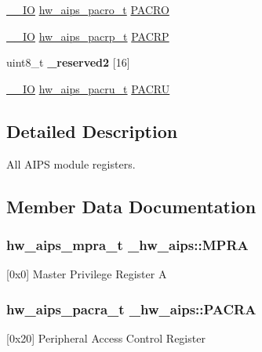 \begin{DoxyCompactItemize}
\item 
\hyperlink{core__sc300_8h_aec43007d9998a0a0e01faede4133d6be}{\+\_\+\+\_\+\+IO} \hyperlink{union__hw__aips__pacro}{hw\+\_\+aips\+\_\+pacro\+\_\+t} \hyperlink{struct__hw__aips_a0d26b9dd4c8d965d38a908720cc30631}{P\+A\+C\+RO}
\item 
\hyperlink{core__sc300_8h_aec43007d9998a0a0e01faede4133d6be}{\+\_\+\+\_\+\+IO} \hyperlink{union__hw__aips__pacrp}{hw\+\_\+aips\+\_\+pacrp\+\_\+t} \hyperlink{struct__hw__aips_a04e3d2f12f78b6bad6cc1dbb8c24c704}{P\+A\+C\+RP}
\item 
uint8\+\_\+t {\bfseries \+\_\+reserved2} \mbox{[}16\mbox{]}\hypertarget{struct__hw__aips_abe4fbc96c443539d143fbbd6bf7f08f4}{}\label{struct__hw__aips_abe4fbc96c443539d143fbbd6bf7f08f4}

\item 
\hyperlink{core__sc300_8h_aec43007d9998a0a0e01faede4133d6be}{\+\_\+\+\_\+\+IO} \hyperlink{union__hw__aips__pacru}{hw\+\_\+aips\+\_\+pacru\+\_\+t} \hyperlink{struct__hw__aips_ac220c75d60f70e9fd86cf43ef7006cec}{P\+A\+C\+RU}
\end{DoxyCompactItemize}


\subsection{Detailed Description}
All A\+I\+PS module registers. 

\subsection{Member Data Documentation}
\subsubsection[{\texorpdfstring{M\+P\+RA}{MPRA}}]{ {\bf hw\+\_\+aips\+\_\+mpra\+\_\+t} \+\_\+hw\+\_\+aips\+::\+M\+P\+RA}\hypertarget{struct__hw__aips_a01d3ea1329e98e8e25706d64806f85cf}{}\label{struct__hw__aips_a01d3ea1329e98e8e25706d64806f85cf}
\mbox{[}0x0\mbox{]} Master Privilege Register A 
\subsubsection[{\texorpdfstring{P\+A\+C\+RA}{PACRA}}]{ {\bf hw\+\_\+aips\+\_\+pacra\+\_\+t} \+\_\+hw\+\_\+aips\+::\+P\+A\+C\+RA}\hypertarget{struct__hw__aips_aeafe50f6e63f905450ede1b2da2a3ad5}{}\label{struct__hw__aips_aeafe50f6e63f905450ede1b2da2a3ad5}
\mbox{[}0x20\mbox{]} Peripheral Access Control Register 
